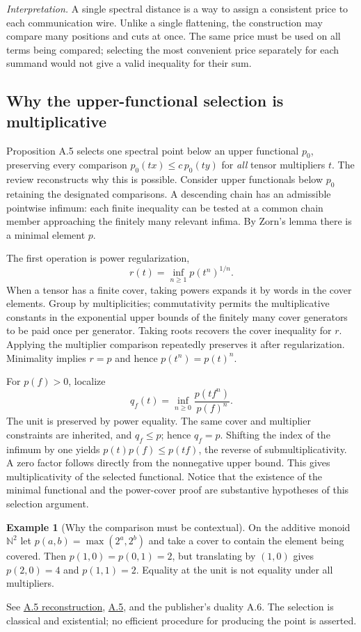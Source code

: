 \documentclass[11pt,letterpaper]{article}
\theoremstyle{definition}\newtheorem{definition}[theorem]{Definition}\newtheorem{example}[theorem]{Example}
\theoremstyle{remark}\newtheorem{remark}[theorem]{Remark}
\newcommand{\N}{\mathbb{N}}
\newcommand{\pub}[3]{\href{https://github.com/anthropics/formal-math/blob/11b6c7e3c927df2658f513b6b68ea7f8929c62c5/vp-vnp/#1\#L#2}{#3}}
\newcommand{\aud}[2]{\href{https://github.com/nousentllc/VP-VNP-Review/blob/567303d0bcf4f9d54390437b137752446e58ccd6/#1}{#2}}
\newcommand{\interpret}[1]{\par\smallskip\noindent\textit{Interpretation.} #1\par\smallskip}
\begin{document}
\interpret{A single spectral distance is a way to assign a consistent price to each communication wire. Unlike a single flattening, the construction may compare many positions and cuts at once. The same price must be used on all terms being compared; selecting the most convenient price separately for each summand would not give a valid inequality for their sum.}

\subsection{Why the upper-functional selection is multiplicative}\label{sec:gauges}
Proposition A.5 selects one spectral point below an upper functional $p_0$, preserving every comparison $p_0(tx)\le c\,p_0(ty)$ for \emph{all} tensor multipliers $t$. The review reconstructs why this is possible. Consider upper functionals below $p_0$ retaining the designated comparisons. A descending chain has an admissible pointwise infimum: each finite inequality can be tested at a common chain member approaching the finitely many relevant infima. By Zorn's lemma there is a minimal element $p$.

The first operation is power regularization,
\[
 r(t)=\inf_{n\ge1} p(t^n)^{1/n}.
\]
When a tensor has a finite cover, taking powers expands it by words in the cover elements. Group by multiplicities; commutativity permits the multiplicative constants in the exponential upper bounds of the finitely many cover generators to be paid once per generator. Taking roots recovers the cover inequality for $r$. Applying the multiplier comparison repeatedly preserves it after regularization. Minimality implies $r=p$ and hence $p(t^n)=p(t)^n$.

For $p(f)>0$, localize
\[
 q_f(t)=\inf_{n\ge0}\frac{p(tf^n)}{p(f)^n}.
\]
The unit is preserved by power equality. The same cover and multiplier constraints are inherited, and $q_f\le p$; hence $q_f=p$. Shifting the index of the infimum by one yields $p(t)p(f)\le p(tf)$, the reverse of submultiplicativity. A zero factor follows directly from the nonnegative upper bound. This gives multiplicativity of the selected functional. Notice that the existence of the minimal functional and the power-cover proof are substantive hypotheses of this selection argument.
\begin{example}[Why the comparison must be contextual]
On the additive monoid $\N^2$ let $p(a,b)=\max(2^a,2^b)$ and take a cover to contain the element being covered. Then $p(1,0)=p(0,1)=2$, but translating by $(1,0)$ gives $p(2,0)=4$ and $p(1,1)=2$. Equality at the unit is not equality under all multipliers.
\end{example}
See \aud{passes/11b-spectral-selection.md}{A.5 reconstruction}, \pub{Paper/Gauges.lean}{392}{A.5}, and the publisher's duality A.6. The selection is classical and existential; no efficient procedure for producing the point is asserted.
\end{document}

